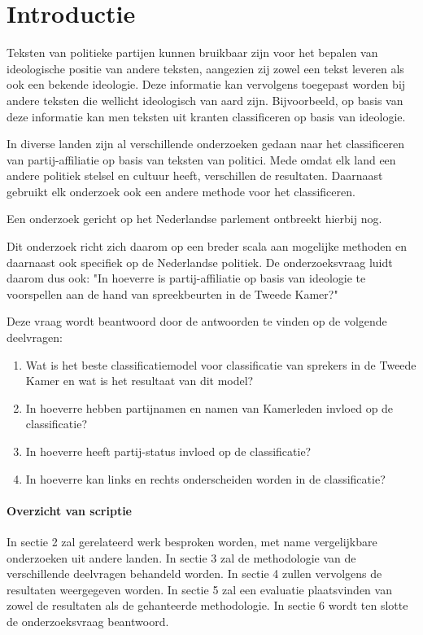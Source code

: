 \section{Introductie}
\label{sec:intro}
Teksten van politieke partijen kunnen bruikbaar zijn voor het bepalen van ideologische positie van andere teksten, aangezien zij zowel een tekst leveren als ook een bekende ideologie. Deze informatie kan vervolgens toegepast worden bij andere teksten die wellicht ideologisch van aard zijn. Bijvoorbeeld, op basis van deze informatie kan men teksten uit kranten classificeren op basis van ideologie.\cite{DBLP:journals/corr/Biessmann16}\cite{Hirst_textto}\par
In diverse landen zijn al verschillende onderzoeken gedaan naar het classificeren van partij-affiliatie op basis van teksten van politici.\cite{Ferreira2016UsingTT}\cite{DBLP:journals/corr/Biessmann16} Mede omdat elk land een andere politiek stelsel en cultuur heeft, verschillen de resultaten. Daarnaast gebruikt elk onderzoek ook een andere methode voor het classificeren. \par
Een onderzoek gericht op het Nederlandse parlement ontbreekt hierbij nog. \par
Dit onderzoek richt zich daarom op een breder scala aan mogelijke methoden en daarnaast ook specifiek op de Nederlandse politiek. De onderzoeksvraag luidt daarom dus ook: "In hoeverre is partij-affiliatie op basis van ideologie te voorspellen aan de hand van spreekbeurten in de Tweede Kamer?"\par
Deze vraag wordt beantwoord door de antwoorden te vinden op de volgende deelvragen:
\begin{enumerate}
    \item Wat is het beste classificatiemodel voor classificatie van sprekers in de Tweede Kamer en wat is het resultaat van dit model?
    \item In hoeverre hebben partijnamen en namen van Kamerleden invloed op de classificatie?
    \item In hoeverre heeft partij-status invloed op de classificatie?
    \item In hoeverre kan links en rechts onderscheiden worden in de classificatie?
\end{enumerate}


\paragraph{Overzicht van scriptie}
In sectie 2 zal gerelateerd werk besproken worden, met name vergelijkbare onderzoeken uit andere landen. In sectie 3 zal de methodologie van de verschillende deelvragen behandeld worden. In sectie 4 zullen vervolgens de resultaten weergegeven worden. In sectie 5 zal een evaluatie plaatsvinden van zowel de resultaten als de gehanteerde methodologie. In sectie 6 wordt ten slotte de onderzoeksvraag beantwoord.
